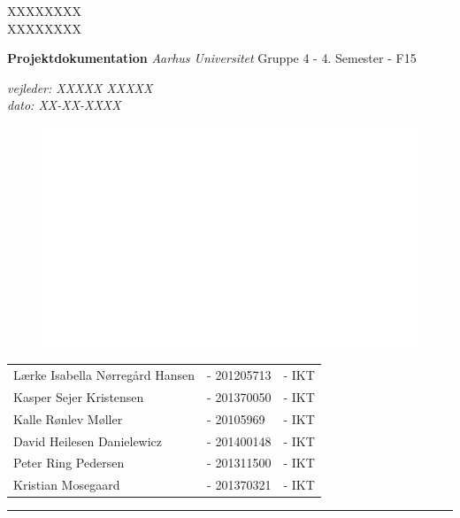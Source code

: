 
\begin{titlingpage}

\noindent
\titlefont XXXXXXXX \\[0.7\baselineskip] XXXXXXXX\par
\epigraph{
\textbf{Projektdokumentation}\newline
\textit{Aarhus Universitet}\newline
Gruppe 4 - 4. Semester - F15\newline
}%
{\textit{vejleder: XXXXX XXXXX}\\
\textit{dato: XX-XX-XXXX}}
\vspace*{2cm}
\begin{minipage}{0.64\linewidth}
    \begin{flushleft}
		\normalsize
		\begin{figure}[H]
			\centering
			\includegraphics[scale=0.50]{Forside/rigebillede}
			\label{photo:RigeBillede}
		\end{figure}
    \end{flushleft}
\end{minipage}
\null\vfill
\vspace*{1cm}
\noindent

\begin{minipage}{0.64\linewidth}
    \begin{flushleft}
		\normalsize
		\begin{tabular}{l l l}
 			  Lærke Isabella Nørregård Hansen 		&- 201205713 	&- IKT \\
			  Kasper Sejer Kristensen				&- 201370050	&- IKT \\
			  Kalle Rønlev Møller					&- 20105969		&- IKT \\
			  David Heilesen Danielewicz			&- 201400148	&- IKT \\
			  Peter Ring Pedersen					&- 201311500	&- IKT \\
			  Kristian Mosegaard					&- 201370321	&- IKT
		\end{tabular}
    \end{flushleft}
\end{minipage}
%
\begin{minipage}{0.02\linewidth}
    \rule{1pt}{90pt}
\end{minipage}
\titlepagedecoration
\end{titlingpage}

